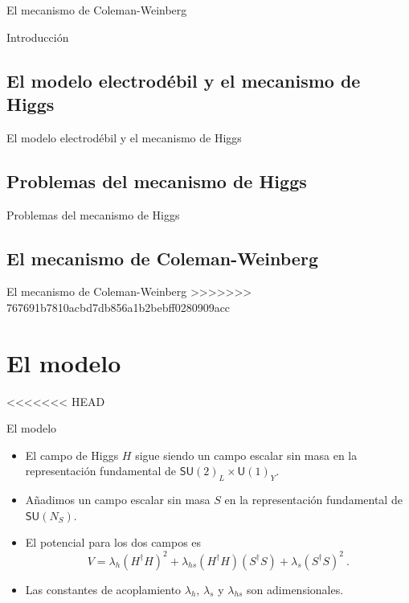 \documentclass{beamer}
\begin{document}
\begin{frame}{El mecanismo de Coleman-Weinberg}
\begin{frame}[t]{Introducción}
\end{frame}
\subsection{El modelo electrodébil y el mecanismo de Higgs}
\begin{frame}[t]{El modelo electrodébil y el mecanismo de Higgs}

\end{frame}

\subsection{Problemas del mecanismo de Higgs}
\begin{frame}[t]{Problemas del mecanismo de Higgs}

\end{frame}

\subsection{El mecanismo de Coleman-Weinberg}
\begin{frame}[t]{El mecanismo de Coleman-Weinberg}
>>>>>>> 767691b7810acbd7db856a1b2bebff0280909acc

\end{frame}

\section{El modelo}
<<<<<<< HEAD
\begin{frame}{El modelo}
\begin{itemize}
\item<only@1> El campo de Higgs $H$ sigue siendo un campo escalar sin masa en la representación fundamental de $\mathsf{SU}(2)_L\times \mathsf{U}(1)_Y$.
\item<only@1> Añadimos un campo escalar sin masa $S$ en la representación fundamental de $\mathsf{SU}(N_S)$.
\item<only@1> El potencial para los dos campos es
\begin{equation}\label{eq:CWpotential}
V = \lambda_h (H^\dagger H)^2 + \lambda_{hs} (H^\dagger H) (S^\dagger S) + \lambda_s (S^\dagger S)^2\ .
\end{equation}
\item<only@1> Las constantes de acoplamiento $\lambda_h$, $\lambda_s$ y $\lambda_{hs}$ son adimensionales.


\end{itemize}
\end{frame}
\end{frame}
\end{document}
